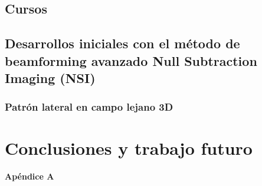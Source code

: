 \documentclass[10pt,a4paper]{article}
\begin{document}
\subsection{Cursos}

\subsection{Desarrollos iniciales con el método de beamforming avanzado Null Subtraction Imaging (NSI)}\label{sec:nsi}
\subsubsection{Patrón lateral en campo lejano 3D}


\section{Conclusiones y trabajo futuro}\label{sec:conclusiones}

\newpage
\appendix

\vspace*{\fill}
\begin{center}
	{\LARGE \textbf{Apéndice A}}
\end{center}
\vspace*{\fill}
\newpage

%
\end{document}
